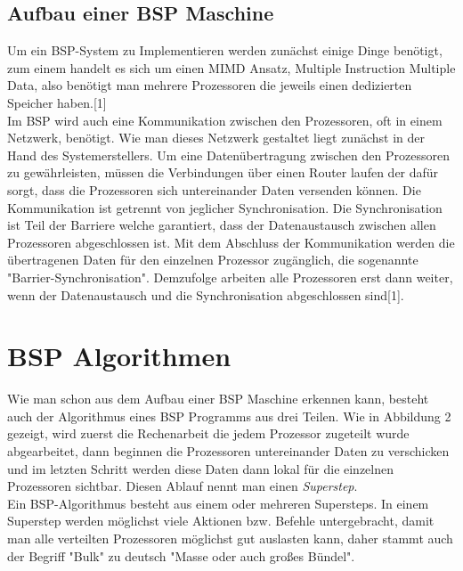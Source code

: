 \documentclass[a4paper,10pt]{scrartcl}
\begin{document}
\subsection{Aufbau einer BSP Maschine}
Um ein BSP-System zu Implementieren werden zunächst einige Dinge benötigt, zum einem handelt es sich um einen MIMD Ansatz, Multiple Instruction Multiple Data, also benötigt man mehrere Prozessoren die jeweils einen dedizierten Speicher haben.[1]\\
Im BSP wird auch eine Kommunikation zwischen den Prozessoren, oft in einem Netzwerk, benötigt. Wie man dieses Netzwerk gestaltet liegt zunächst in der Hand des Systemerstellers. Um eine Datenübertragung zwischen den Prozessoren zu gewährleisten, müssen die Verbindungen über einen Router laufen der dafür sorgt, dass die Prozessoren sich untereinander Daten versenden können. Die Kommunikation ist getrennt von jeglicher Synchronisation. Die Synchronisation ist Teil der Barriere welche garantiert, dass der Datenaustausch zwischen allen Prozessoren abgeschlossen ist. Mit dem Abschluss der Kommunikation werden die übertragenen Daten für den einzelnen Prozessor zugänglich, die sogenannte "Barrier-Synchronisation". Demzufolge arbeiten alle Prozessoren erst dann weiter, wenn der Datenaustausch und die Synchronisation abgeschlossen sind[1].

\newpage

\section{BSP Algorithmen}
Wie man schon aus dem Aufbau einer BSP Maschine erkennen kann, besteht auch der Algorithmus eines BSP Programms aus drei Teilen. Wie in Abbildung 2 gezeigt, wird zuerst die Rechenarbeit die jedem Prozessor zugeteilt wurde abgearbeitet, dann beginnen die Prozessoren untereinander Daten zu verschicken und im letzten Schritt werden diese Daten dann lokal für die einzelnen Prozessoren sichtbar. Diesen Ablauf nennt man einen \textit{Superstep}.\\
Ein BSP-Algorithmus besteht aus einem oder mehreren Supersteps. In einem Superstep werden möglichst viele Aktionen bzw. Befehle untergebracht, damit man alle verteilten Prozessoren möglichst gut auslasten kann, daher stammt auch der Begriff "Bulk" zu deutsch "Masse oder auch großes Bündel".  	
\end{document}
